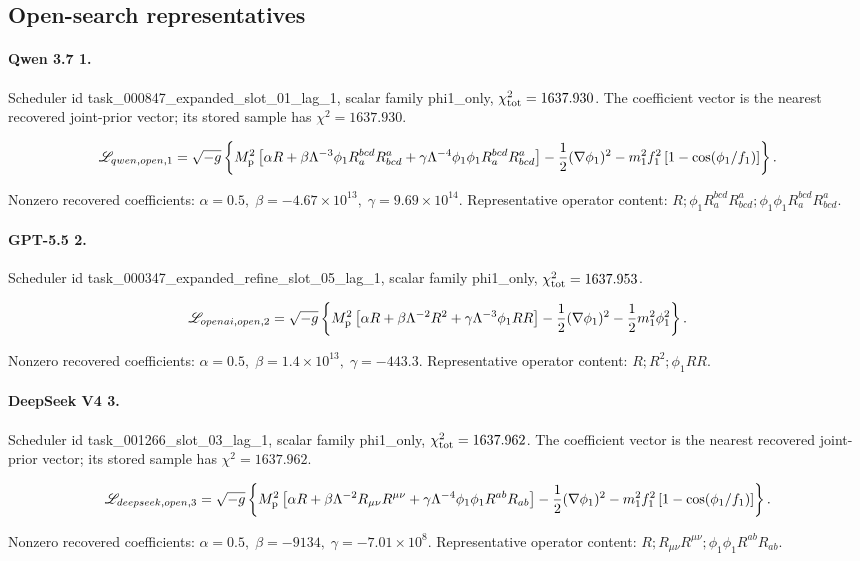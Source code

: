 \documentclass[aps,prd,twocolumn,superscriptaddress,nofootinbib,longbibliography]{revtex4-2}
\newcommand{\Mp}{M_{\rm p}}
\newcommand{\chiT}{\chi^2_{\rm tot}}
\begin{document}
\subsection{Open-search representatives}

\paragraph*{Qwen 3.7 1.} Scheduler id task\_000847\_expanded\_slot\_01\_lag\_1, scalar family phi1\_only, $\chiT=1637.930$. The coefficient vector is the nearest recovered joint-prior vector; its stored sample has $\chi^2=1637.930$.
\begin{widetext}
\begin{equation}
\mathscr{L}_{qwen,open,1}=\sqrt{-g}\left\{\Mp^2\left[\alpha R + \beta \Lambda^{-3} \phi_1 R^{bcd}_{a} R^{a}_{bcd} + \gamma \Lambda^{-4} \phi_1 \phi_1 R^{bcd}_{a} R^{a}_{bcd}\right] - \frac12(\nabla\phi_1)^2 - m_1^2f_1^2\left[1-\cos(\phi_1/f_1)\right]\right\}.
\end{equation}
\end{widetext}
\noindent Nonzero recovered coefficients: $\alpha=0.5,\; \beta=-4.67\times 10^{13},\; \gamma=9.69\times 10^{14}$. Representative operator content: $R; \phi_1 R^{bcd}_{a} R^{a}_{bcd}; \phi_1 \phi_1 R^{bcd}_{a} R^{a}_{bcd}$.

\paragraph*{GPT-5.5 2.} Scheduler id task\_000347\_expanded\_refine\_slot\_05\_lag\_1, scalar family phi1\_only, $\chiT=1637.953$.
\begin{widetext}
\begin{equation}
\mathscr{L}_{openai,open,2}=\sqrt{-g}\left\{\Mp^2\left[\alpha R + \beta \Lambda^{-2} R^2 + \gamma \Lambda^{-3} \phi_1 R R\right] - \frac12(\nabla\phi_1)^2 - \frac12m_1^2\phi_1^2\right\}.
\end{equation}
\end{widetext}
\noindent Nonzero recovered coefficients: $\alpha=0.5,\; \beta=1.4\times 10^{13},\; \gamma=-443.3$. Representative operator content: $R; R^2; \phi_1 R R$.

\paragraph*{DeepSeek V4 3.} Scheduler id task\_001266\_slot\_03\_lag\_1, scalar family phi1\_only, $\chiT=1637.962$. The coefficient vector is the nearest recovered joint-prior vector; its stored sample has $\chi^2=1637.962$.
\begin{widetext}
\begin{equation}
\mathscr{L}_{deepseek,open,3}=\sqrt{-g}\left\{\Mp^2\left[\alpha R + \beta \Lambda^{-2} R_{\mu\nu}R^{\mu\nu} + \gamma \Lambda^{-4} \phi_1 \phi_1 R^{ab} R_{ab}\right] - \frac12(\nabla\phi_1)^2 - m_1^2f_1^2\left[1-\cos(\phi_1/f_1)\right]\right\}.
\end{equation}
\end{widetext}
\noindent Nonzero recovered coefficients: $\alpha=0.5,\; \beta=-9134,\; \gamma=-7.01\times 10^{8}$. Representative operator content: $R; R_{\mu\nu}R^{\mu\nu}; \phi_1 \phi_1 R^{ab} R_{ab}$.
\end{document}
